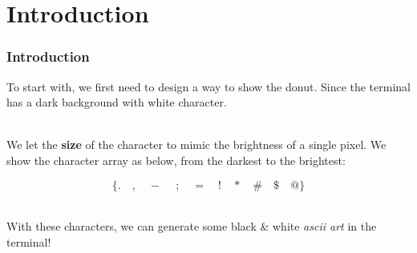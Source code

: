 \documentclass[12pt, t]{beamer}
\renewcommand{\emph}[1]{{\color{Turquoise3}\textsl{#1}}}
\newcommand{\nullspace}{~\\[15pt]}
\begin{document}

\section{Introduction}
\begin{frame}
    \frametitle{Introduction}

    To start with, we first need to design a way to show the donut. Since the terminal has a dark 
    background with white character.
    
    \nullspace
    We let the \textbf{size} of the character to mimic the brightness of a single pixel. We show 
    the character array as below, from the darkest to the brightest:

    \begin{equation*}
        \{.\quad ,\quad -~\quad ;\quad =\quad !\quad *\quad \#\quad \$\quad @\}
    \end{equation*}

    \nullspace
    With these characters, we can generate some black \& white \emph{ascii art} in the terminal!

\end{frame}

\end{document}

